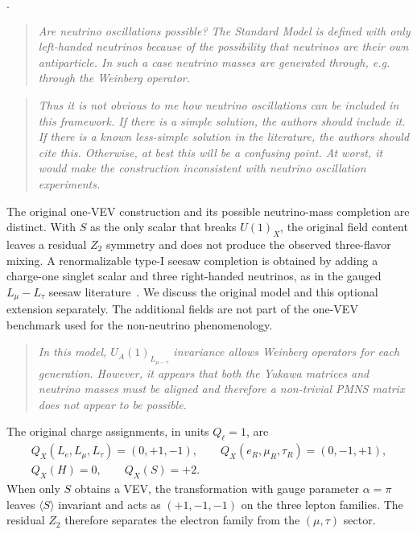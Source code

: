 \documentclass[12pt,a4paper]{article}
\begin{document}
\medskip
{}.

\begin{quote}\itshape
Are neutrino oscillations possible? The Standard Model is defined with only left-handed neutrinos because of the possibility that neutrinos are their own antiparticle. In such a case neutrino masses are generated through, e.g. through the Weinberg operator.
\end{quote}

\begin{quote}\itshape
Thus it is not obvious to me how neutrino oscillations can be included in this framework. If there is a simple solution, the authors should include it. If there is a known less-simple solution in the literature, the authors should cite this. Otherwise, at best this will be a confusing point. At worst, it would make the construction inconsistent with neutrino oscillation experiments.
\end{quote}

The original one-VEV construction and its possible neutrino-mass completion are distinct. With \(S\) as the only scalar that breaks \(U(1)_X\), the original field content leaves a residual \(Z_2\) symmetry and does not produce the observed three-flavor mixing. A renormalizable type-I seesaw completion is obtained by adding a charge-one singlet scalar and three right-handed neutrinos, as in the gauged \(L_\mu-L_\tau\) seesaw literature~\cite{Heeck:2011wj,Borah:2021twoSingletSeesaw,He:2024twoSingletHNL}. We discuss the original model and this optional extension separately. The additional fields are not part of the one-VEV benchmark used for the non-neutrino phenomenology.

\medskip
{}

\begin{quote}\itshape
In this model, \(U_A(1)_{L_{\mu-\tau}}\) invariance allows Weinberg operators for each generation. However, it appears that both the Yukawa matrices and neutrino masses must be aligned and therefore a non-trivial PMNS matrix does not appear to be possible.
\end{quote}

The original charge assignments, in units \(Q_\ell=1\), are
\[
\begin{gathered}
Q_X(L_e,L_\mu,L_\tau)=(0,+1,-1),\qquad
Q_X(e_R,\mu_R,\tau_R)=(0,-1,+1),\\
Q_X(H)=0,\qquad Q_X(S)=+2.
\end{gathered}
\]
When only \(S\) obtains a VEV, the transformation with gauge parameter \(\alpha=\pi\) leaves \(\langle S\rangle\) invariant and acts as \((+1,-1,-1)\) on the three lepton families. The residual \(Z_2\) therefore separates the electron family from the \((\mu,\tau)\) sector.
\end{document}
